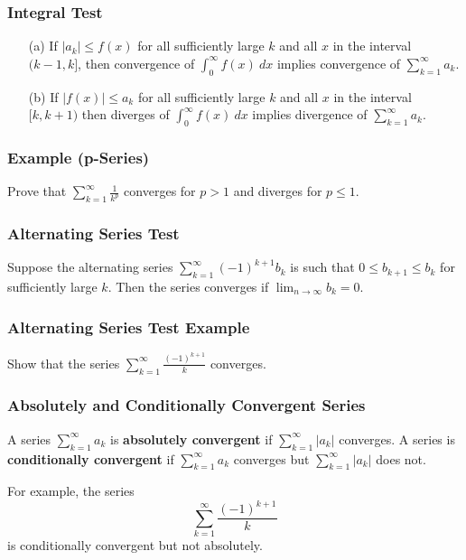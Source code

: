 \documentclass{beamer}
\begin{document}
 \begin{frame}
  \frametitle{Integral Test}
  
  \begin{Theorem}
\begin{enumerate}
\item[(a)] If $|a_k| \leq f(x)$ for all sufficiently large $k$ and all $x$ in the interval $(k - 1, k]$, then convergence of $\displaystyle\int_0^\infty f(x)\ dx$ implies convergence of $\displaystyle\sum_{k = 1}^\infty a_k$.
\item[(b)] If $|f(x)| \leq a_k$ for all sufficiently large $k$ and all $x$ in the interval $[k, k+1)$ then diverges of $\displaystyle\int_0^\infty f(x)\ dx$ implies divergence of $\displaystyle\sum_{k = 1}^\infty a_k$.
\end{enumerate}
\end{Theorem}
  
  \end{frame}
  
  \begin{frame}[t]
  \frametitle{Example (p-Series)}
  \begin{Example}
  Prove that $\displaystyle\sum_{k = 1}^\infty \frac{1}{k^p}$ converges for $p > 1$ and diverges for $p\leq 1$.
  \end{Example}
  
  \end{frame}
  
  \begin{frame}
  \frametitle{Alternating Series Test}
  
  \begin{Theorem} 
Suppose the alternating series $\displaystyle\sum_{k = 1}^\infty (-1)^{k + 1} b_k$ is such that $0 \leq b_{k + 1} \leq b_k$ for sufficiently large $k$. Then the series converges if $\displaystyle\lim_{n\to\infty} b_k = 0$.
  \end{Theorem}
  \end{frame}
   
  \begin{frame}[t]
 \frametitle{Alternating Series Test Example}
 \begin{Example}
 Show that the series $\displaystyle\sum_{k = 1}^\infty \frac{(-1)^{k + 1}}{k}$ converges.
 \end{Example}
 
 \end{frame}
 
 
 \begin{frame}
  \frametitle{Absolutely and Conditionally Convergent Series}
  
  \begin{Definition}
  A series $\displaystyle\sum_{k = 1}^\infty a_k$ is {\bf absolutely convergent} if $\displaystyle\sum_{k = 1}^\infty |a_k|$ converges. A series is {\bf conditionally convergent} if $\displaystyle\sum_{k = 1}^\infty a_k$ converges but $\displaystyle\sum_{k = 1}^\infty |a_k|$ does not.
  \end{Definition}
  For example, the series
  $$
  \sum_{k = 1}^\infty \frac{(-1)^{k + 1}}{k}
  $$
  is conditionally convergent but not absolutely. 
  
 \end{frame}
 
\end{document}
